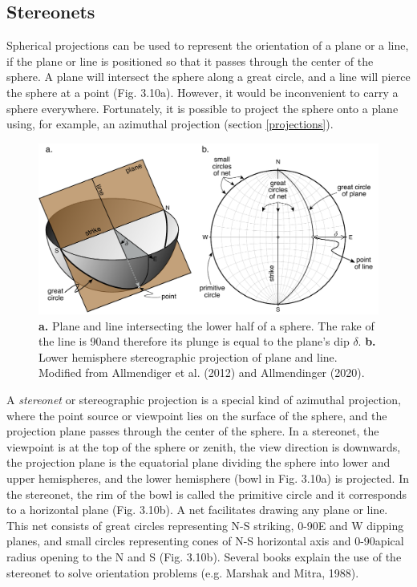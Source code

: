 \documentclass[a4paper , 12pt]{book}
\begin{document}
\subsection{Stereonets}

Spherical projections can be used to represent the orientation of a plane or a line, if the plane or line is positioned so that it passes through the center of the sphere. A plane will intersect the sphere along a great circle, and a line will pierce the sphere at a point (Fig. 3.10a). However, it would be inconvenient to carry a sphere everywhere. Fortunately, it is possible to project the sphere onto a plane using, for example, an azimuthal projection (section \ref{projections}).

\begin{figure}[ht]
    \centering
    \includegraphics[width=13cm]{ch3f10.pdf}
    \caption{\textbf{a.} Plane and line intersecting the lower half of a sphere. The rake of the line is 90\degree\space and therefore its plunge is equal to the plane’s dip $\delta$. \textbf{b.} Lower hemisphere stereographic projection of plane and line. Modified from Allmendiger et al. (2012) and Allmendinger (2020).}
\end{figure}

A \textit{stereonet} or stereographic projection is a special kind of azimuthal projection, where the point source or viewpoint lies on the surface of the sphere, and the projection plane passes through the center of the sphere. In a stereonet, the viewpoint is at the top of the sphere or zenith, the view direction is downwards, the projection plane is the equatorial plane dividing the sphere into lower and upper hemispheres, and the lower hemisphere (bowl in Fig. 3.10a) is projected. In the stereonet, the rim of the bowl is called the primitive circle and it corresponds to a horizontal plane (Fig. 3.10b). A net facilitates drawing any plane or line. This net consists of great circles representing N-S striking, 0-90\degree\space E and W dipping planes, and small circles representing cones of N-S horizontal axis and 0-90\degree\space apical radius opening to the N and S (Fig. 3.10b). Several books explain the use of the stereonet to solve orientation problems (e.g. Marshak and Mitra, 1988).
\end{document}
